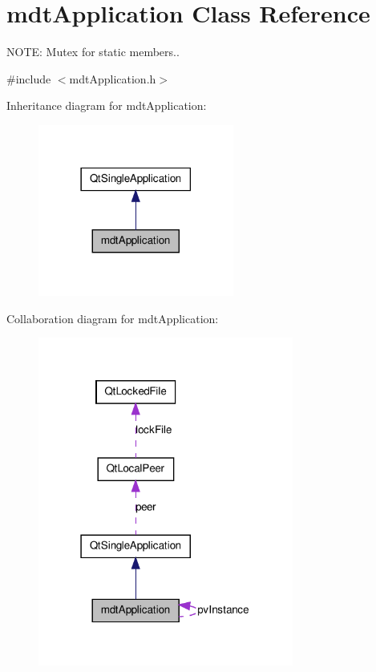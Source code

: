 \hypertarget{classmdt_application}{
\section{mdtApplication Class Reference}
\label{classmdt_application}
}


NOTE: Mutex for static members..  




{\ttfamily \#include $<$mdtApplication.h$>$}



Inheritance diagram for mdtApplication:\nopagebreak
\begin{figure}[H]
\begin{center}
\leavevmode
\includegraphics[width=182pt]{classmdt_application__inherit__graph}
\end{center}
\end{figure}


Collaboration diagram for mdtApplication:\nopagebreak
\begin{figure}[H]
\begin{center}
\leavevmode
\includegraphics[width=238pt]{classmdt_application__coll__graph}
\end{center}
\end{figure}
